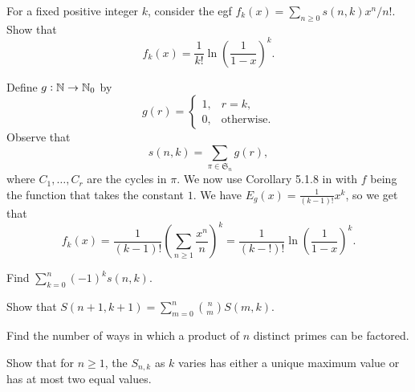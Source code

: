 		\begin{problem}
			For a fixed positive integer $k$, consider the egf $f_k(x) = \sum_{n \ge 0} s(n,k) x^n/n!$. Show that
			\[ f_k(x) = \frac{1}{k!} \ln\left( \frac{1}{1-x} \right)^k. \]
		\end{problem}
		\begin{solution*}
			Define $g : \mathbb{N} \to \mathbb{N}_0$ by
			\[ g(r) = \begin{cases} 1, & r = k, \\ 0, & \text{otherwise.} \end{cases} \]
			Observe that
			\[ s(n,k) = \sum_{\pi \in \mathfrak{S}_n} g(r), \]
			where $C_1,\ldots,C_r$ are the cycles in $\pi$. We now use Corollary 5.1.8 in \cite{ec2} with $f$ being the function that takes the constant $1$. We have $E_g(x) = \frac{1}{(k-1)!} x^k$, so we get that
			\[ f_k(x) = \frac{1}{(k-1)!} \left( \sum_{n \ge 1} \frac{x^n}{n} \right)^k = \frac{1}{(k-!)!} \ln \left( \frac{1}{1-x} \right)^k. \]
		\end{solution*}

		\begin{problem}
			Find $\sum_{k=0}^n (-1)^k s(n,k)$.
		\end{problem}
		\begin{solution*}
			
		\end{solution*}


		\begin{problem}
			Show that $S(n+1,k+1) = \sum_{m=0}^n \binom{n}{m} S(m,k)$.
		\end{problem}
		\begin{solution*}
			
		\end{solution*}

		\begin{problem}
			Find the number of ways in which a product of $n$ distinct primes can be factored.
		\end{problem}
		\begin{solution*}
			
		\end{solution*}

		\begin{problem}
			Show that for $n \ge 1$, the $S_{n,k}$ as $k$ varies has either a unique maximum value or has at most two equal values.
		\end{problem}
		\begin{solution*}
			
		\end{solution*}